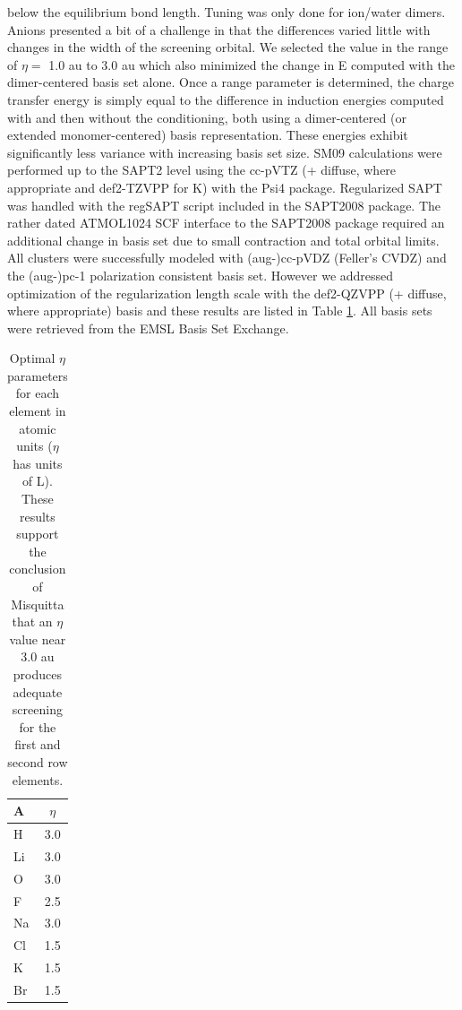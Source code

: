 \begin{sie}
    below the equilibrium bond length. Tuning was only done for ion/water dimers. Anions presented a bit of a challenge in that the differences
    varied little with changes in the width of the screening orbital. We selected the value in the range of $\eta =$ 1.0 au to 3.0 au which
    also minimized the change in E computed with the dimer-centered basis set alone. Once a range parameter is determined,
    the charge transfer energy is simply equal to the difference in induction energies computed with and then without the conditioning, both
    using a dimer-centered (or extended monomer-centered) basis representation. These energies exhibit significantly less variance with 
    increasing basis set size. SM09 calculations were performed up to the SAPT2 level using the cc-pVTZ (+ diffuse, where appropriate and 
    def2-TZVPP for K\sur{+})\cite{dunning1989h,dunning1992of,dunning1993cl,dunning1999br,hattig2002ri,rappoport2010def2,rappoport2015kri}
    with the Psi4 package\cite{sherrill2012psi4,hohenstein2010df,hohenstein2012sapt}. Regularized SAPT was handled with the regSAPT
    script included in the SAPT2008 package\cite{jeziorski2012sapt}. The rather dated ATMOL1024 SCF interface\cite{saundersatmol} to the SAPT2008 
    package required an additional change in basis set due to small contraction and total orbital limits. All clusters were successfully modeled with 
    (aug-)cc-pVDZ (Feller's CVDZ) and the (aug-)pc-1 polarization consistent basis 
    set\cite{jensen2001principles,jensen2002diffusefxns,jensen2004cl,jensen2007lina,jensen2012kbr}. However we 
    addressed optimization of the regularization length scale with the def2-QZVPP (+ diffuse, where appropriate) basis\cite{rappoport2010def2}
    and these results are listed in Table \ref{tab:ion_params}. All basis sets were retrieved from the EMSL Basis Set Exchange\cite{emsl1996,emsl2007}.
    
\begin{table}
 \begin{center}
  \begin{tabular}{lc}
   \hline
   \hline
    A & $\eta$ \tabularnewline
   \hline
    H         & 3.0  \tabularnewline
    Li\sur{+} & 3.0  \tabularnewline
    O         & 3.0  \tabularnewline
    F\sur{-}  & 2.5  \tabularnewline
    Na\sur{+} & 3.0  \tabularnewline
    Cl\sur{-} & 1.5  \tabularnewline
    K\sur{+}  & 1.5  \tabularnewline  
    Br\sur{-} & 1.5  \tabularnewline 
   \hline 
   \hline
  \end{tabular}
 \end{center}
 \caption[Optimal range parameters for regularizing potential]{\label{tab:ion_params} Optimal $\eta$ parameters for each element in atomic units ($\eta$ 
 has units of L). These results support the conclusion of Misquitta that an $\eta$ value near 3.0 au produces adequate screening for the first and 
 second row elements.}
 \end{table}


\end{sie}
